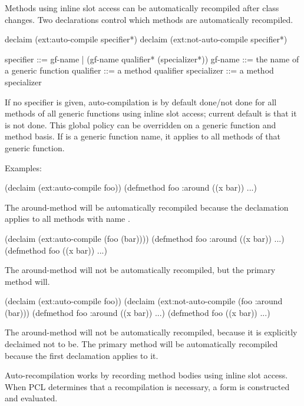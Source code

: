 Methods using inline slot access can be automatically recompiled after
class changes.  Two declarations control which methods are
automatically recompiled.

\begin{example}
declaim (ext:auto-compile specifier*)
declaim (ext:not-auto-compile specifier*)

specifier   ::= gf-name | (gf-name qualifier* (specializer*))
gf-name     ::= the name of a generic function
qualifier   ::= a method qualifier
specializer ::= a method specializer
\end{example}

If no specifier is given, auto-compilation is by default done/not done
for all methods of all generic functions using inline slot access;
current default is that it is not done.  This global policy can be
overridden on a generic function and method basis.  If
 is a generic function name, it applies to all methods
of that generic function.

Examples:

\begin{example}
(declaim (ext:auto-compile foo))
(defmethod foo :around ((x bar)) ...)
\end{example}

The around-method  will be automatically recompiled because
the declamation applies to all methods with name .

\begin{example}
(declaim (ext:auto-compile (foo (bar))))
(defmethod foo :around ((x bar)) ...)
(defmethod foo ((x bar)) ...)
\end{example}

The around-method will not be automatically recompiled, but the
primary method will.

\begin{example}
(declaim (ext:auto-compile foo))
(declaim (ext:not-auto-compile (foo :around (bar)))  
(defmethod foo :around ((x bar)) ...)
(defmethod foo ((x bar)) ...)
\end{example}

The around-method will not be automatically recompiled, because it
is explicitly declaimed not to be.  The primary method will be
automatically recompiled because the first declamation applies to
it.

Auto-recompilation works by recording method bodies using inline slot
access.  When PCL determines that a recompilation is necessary, a
 form is constructed and evaluated.


